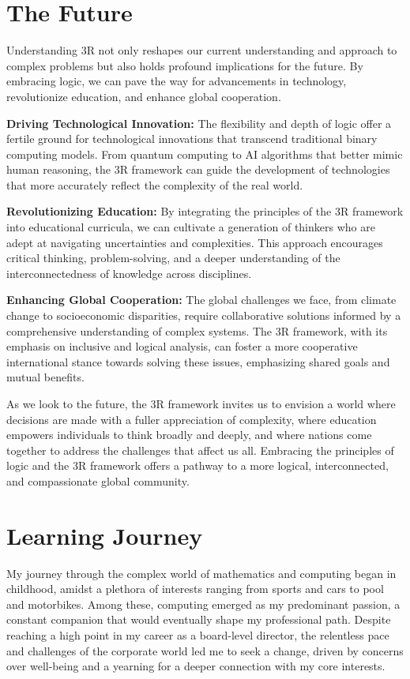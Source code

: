 \documentclass[12pt]{article}
\begin{document}
\section*{The Future}

Understanding 3R not only reshapes our current understanding and approach to complex problems but also holds profound implications for the future. By embracing \qbit{} logic, we can pave the way for advancements in technology, revolutionize education, and enhance global cooperation.

\textbf{Driving Technological Innovation:} The flexibility and depth of \qbit{} logic offer a fertile ground for technological innovations that transcend traditional binary computing models. From quantum computing to AI algorithms that better mimic human reasoning, the 3R framework can guide the development of technologies that more accurately reflect the complexity of the real world.

\textbf{Revolutionizing Education:} By integrating the principles of the 3R framework into educational curricula, we can cultivate a generation of thinkers who are adept at navigating uncertainties and complexities. This approach encourages critical thinking, problem-solving, and a deeper understanding of the interconnectedness of knowledge across disciplines.

\textbf{Enhancing Global Cooperation:} The global challenges we face, from climate change to socioeconomic disparities, require collaborative solutions informed by a comprehensive understanding of complex systems. The 3R framework, with its emphasis on inclusive and logical analysis, can foster a more cooperative international stance towards solving these issues, emphasizing shared goals and mutual benefits.

As we look to the future, the 3R framework invites us to envision a world where decisions are made with a fuller appreciation of complexity, where education empowers individuals to think broadly and deeply, and where nations come together to address the challenges that affect us all. Embracing the principles of \qbit{} logic and the 3R framework offers a pathway to a more logical, interconnected, and compassionate global community.

\section*{Learning Journey}

My journey through the complex world of mathematics and computing began in childhood, amidst a plethora of interests ranging from sports and cars to pool and motorbikes. Among these, computing emerged as my predominant passion, a constant companion that would eventually shape my professional path. Despite reaching a high point in my career as a board-level director, the relentless pace and challenges of the corporate world led me to seek a change, driven by concerns over well-being and a yearning for a deeper connection with my core interests.
\end{document}
